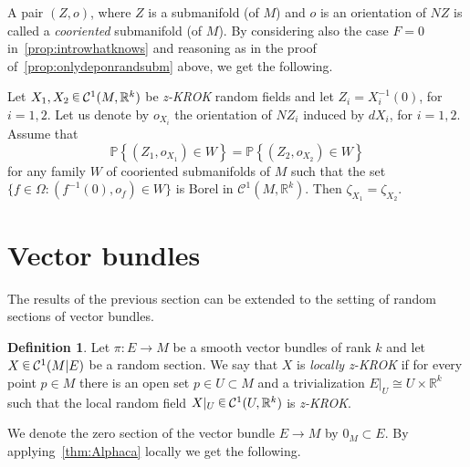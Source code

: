 \documentclass[10pt]{amsart}
\theoremstyle{definition}\newtheorem{defi}[theo]{Definition}\newtheorem{rema}[theo]{Remark}\newtheorem{exam}[theo]{Example}\newtheorem{exem}[theo]{Example}\newtheorem{nota}[theo]{Notation}
\newcommand{\R}{\mathbb{R}}
\newcommand{\PP}{\mathbb{P}}
\newcommand{\mC}{\mathcal{C}}
\newcommand{\zkrok}{\emph{z-KROK}\xspace}
\newcommand*\randin{
\mathchoice {\raisebox{-.35ex}{$\displaystyle{^\subset}$}\mkern-11.5mu\raisebox{+.45ex}{$\displaystyle{_\subset}$}} {\mkern+1mu\raisebox{-.27ex}{$\textstyle{^\subset}$}\mkern-11.7mu\raisebox{+.45ex}{$\textstyle{_\subset}$}} {\raisebox{.35ex}{$\scriptstyle\subset$}\mkern-14mu\raisebox{-.15ex}{$\scriptstyle\subset$}} {\raisebox{.3ex}{$\scriptscriptstyle\subset$}\mkern-13.5mu\raisebox{-.10ex}{$\scriptscriptstyle\subset$}}}
\begin{document}
A pair $(Z,o)$, where $Z$ is a submanifold (of $M$) and $o$ is an orientation of $NZ$ is called a \emph{cooriented} submanifold (of $M$). By considering also the case $F=0$ in~\cref{prop:introwhatknows} and reasoning as in the proof of~\cref{prop:onlydeponrandsubm} above, we get the following.

\begin{prop}\label{prop:onlydeponrandsubm2}
Let $X_1,X_2\,\randin\,\mC^1(M,\R^k)$ be \zkrok random fields and let $Z_i=X_i^{-1}(0)$, for $i=1,2.$ Let us denote by $o_{X_i}$ the orientation of $NZ_i$ induced by $dX_i$, for $i=1,2.$ Assume that
\begin{equation}\label{eq:P1ZZA2}
\PP\left\{ (Z_1,o_{X_1})\in W\right\}=\PP\left\{ (Z_2,o_{X_2})\in W\right\}
\end{equation}
for any family $W$ of cooriented submanifolds of $M$ such that the set $\{ f\in\Omega:(f^{-1}(0),o_f)\in W\}$ is Borel in $\mC^1(M,\R^k)$. Then $\zeta_{X_1}=\zeta_{X_2}$.
\end{prop}



\section{Vector bundles}\label{sec:vectbun}

The results of the previous section can be extended to the setting of random sections of vector bundles.

\begin{defi}\label{de:loczkrok}
Let $\pi:E\to M$ be a smooth vector bundles of rank $k$ and let $X\,\randin\, \mC^1(M|E)$ be a random section. We say that $X$ is \emph{locally \zkrok} if for every point $p\in M$ there is an open set $p\in U\subset M$ and a trivialization $E|_U\cong U\times \R^k$ such that the local random field $X|_U\,\randin\, \mC^1(U,\R^k)$ is \zkrok.
\end{defi}

We denote the zero section of the vector bundle $E\to M$ by $0_M\subset E$. By applying~\cref{thm:Alphaca} locally we get the following.
\end{document}
